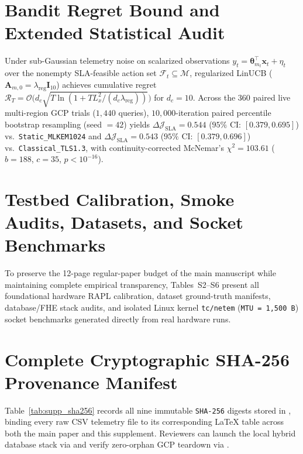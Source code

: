\documentclass[10pt,journal,compsoc]{IEEEtran}
\begin{document}
\section{Bandit Regret Bound and Extended Statistical Audit}\label{sec:supp_stats}
Under sub-Gaussian telemetry noise on scalarized observations $y_t = \boldsymbol{\theta}_{m_t}^\top \mathbf{x}_t + \eta_t$ over the nonempty SLA-feasible action set $\mathcal{F}_t \subseteq \mathcal{M}$, regularized LinUCB ($\mathbf{A}_{m,0} = \lambda_{\text{reg}}\mathbf{I}_{10}$) achieves cumulative regret $\mathcal{R}_T = \mathcal{O}\!\big(d_c \sqrt{T \ln(1 + T L_x^2 / (d_c \lambda_{\text{reg}}))}\big)$ for $d_c = 10$. Across the $360$ paired live multi-region GCP trials ($1{,}440$ queries), $10{,}000$-iteration paired percentile bootstrap resampling (seed $= 42$) yields $\Delta\mathcal{J}_{\text{SLA}} = 0.544$ ($95\%$ CI: $[0.379, 0.695]$) vs.\ \texttt{Static\_\allowbreak MLKEM1024} and $\Delta\mathcal{J}_{\text{SLA}} = 0.543$ ($95\%$ CI: $[0.379, 0.696]$) vs.\ \texttt{Classical\_\allowbreak TLS1.3}, with continuity-corrected McNemar's $\chi^2 = 103.61$ ($b=188$, $c=35$, $p < 10^{-16}$).

\section{Testbed Calibration, Smoke Audits, Datasets, and Socket Benchmarks}\label{sec:supp_tables}
To preserve the 12-page regular-paper budget of the main manuscript while maintaining complete empirical transparency, Tables~S2--S6 present all foundational hardware RAPL calibration, dataset ground-truth manifests, database/FHE stack audits, and isolated Linux kernel \texttt{tc/netem} (\texttt{MTU = 1,500 B}) socket benchmarks generated directly from real hardware runs.











\section{Complete Cryptographic SHA-256 Provenance Manifest}\label{sec:supp_manifest}
Table~\ref{tab:supp_sha256} records all nine immutable \texttt{SHA-256} digests stored in , binding every raw CSV telemetry file to its corresponding LaTeX table across both the main paper and this supplement. Reviewers can launch the local hybrid database stack via  and verify zero-orphan GCP teardown via .
\end{document}
